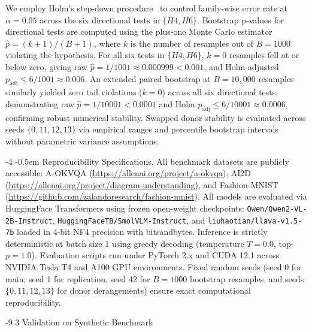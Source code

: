 \documentclass[graybox]{svmult}
\makeatletter
\renewcommand\paragraph{\@startsection{paragraph}{4}{\z@}%
  {-4\p@ \@plus -1\p@ \@minus -1\p@}%
  {-0.5em}%
  {\normalfont\normalsize\bfseries}}
\renewcommand\section{\@startsection{section}{1}{\z@}%
  {-9\p@ \@plus -2\p@ \@minus -1\p@}%
  {3\p@ \@plus 1\p@ \@minus 1\p@}%
  {\normalfont\large\bfseries\boldmath}}
\makeatother
\begin{document}
We employ Holm's step-down procedure~\cite{holm1979simple} to control family-wise error rate at $\alpha = 0.05$ across the six directional tests in $\{H4,H6\}$. Bootstrap p-values for directional tests are computed using the plus-one Monte Carlo estimator $\hat{p} = (k+ 1)/(B + 1)$, where $k$ is the number of resamples out of $B = 1000$ violating the hypothesis. For all six tests in $\{H4,H6\}$, $k = 0$ resamples fell at or below zero, giving raw $\hat{p} = 1/1001 \approx 0.000999 < 0.001$, and Holm-adjusted $p_{\text{adj}} \le 6/1001 \approx 0.006$. An extended paired bootstrap at $B = 10{,}000$ resamples similarly yielded zero tail violations ($k = 0$) across all six directional tests, demonstrating raw $\hat{p} = 1/10001 < 0.0001$ and Holm $p_{\text{adj}} \le 6/10001 \approx 0.0006$, confirming robust numerical stability. Swapped donor stability is evaluated across seeds $\{0,11,12,13\}$ via empirical ranges and percentile bootstrap intervals without parametric variance assumptions.

\paragraph{Reproducibility Specifications.}
All benchmark datasets are publicly accessible: A-OKVQA (\url{https://allenai.org/project/a-okvqa}), AI2D (\url{https://allenai.org/project/diagram-understanding}), and Fashion-MNIST (\url{https://github.com/zalandoresearch/fashion-mnist}). All models are evaluated via HuggingFace Transformers using frozen open-weight checkpoints: \texttt{Qwen/Qwen2-VL-2B-Instruct}, \texttt{HuggingFaceTB/SmolVLM-Instruct}, and \texttt{liuhaotian/llava-v1.5-7b} loaded in 4-bit NF4 precision with bitsandbytes. Inference is strictly deterministic at batch size 1 using greedy decoding (temperature $T=0.0$, top-$p=1.0$). Evaluation scripts run under PyTorch 2.x and CUDA 12.1 across NVIDIA Tesla T4 and A100 GPU environments. Fixed random seeds (seed 0 for main, seed 1 for replication, seed 42 for $B=1000$ bootstrap resamples, and seeds $\{0, 11, 12, 13\}$ for donor derangements) ensure exact computational reproducibility.

\section{Validation on Synthetic Benchmark}
\label{sec:synthetic}
\end{document}

